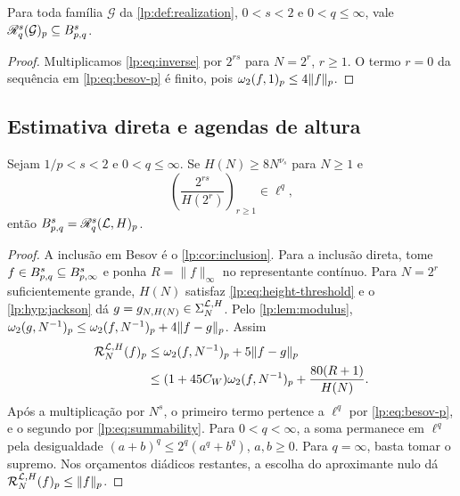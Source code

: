 \documentclass[12pt,a4paper]{article}
\begin{document}
\begin{corolario}
\label{lp:cor:inclusion}
Para toda família $\mathcal G$ da \cref{lp:def:realization}, $0<s<2$ e $0<q\le\infty$, vale
$\mathscr R^{s}_{q}(\mathcal G)_p\subseteq B^{s}_{p,q}$.
\end{corolario}

\begin{proof}
Multiplicamos \eqref{lp:eq:inverse} por $2^{rs}$ para $N=2^r$, $r\ge1$. O termo $r=0$ da sequência em \eqref{lp:eq:besov-p} é finito, pois $\omega_2(f,1)_{p}\le4\|f\|_p$.
\end{proof}

\subsection{Estimativa direta e agendas de altura}

\begin{proposicao}
\label{lp:thm:besov-conditional}
Sejam $1/p<s<2$ e $0<q\le\infty$. Se $H(N)\ge8N^{\nu_s}$ para $N\ge1$ e
\begin{equation}
 \left(\frac{2^{rs}}{H(2^r)}\right)_{r\ge1}\in\ell^q,
 \label{lp:eq:summability}
\end{equation}
então $B^{s}_{p,q}=\mathscr R^{s}_{q}(\mathcal L,H)_p$.
\end{proposicao}

\begin{proof}
A inclusão em Besov é o \cref{lp:cor:inclusion}. Para a inclusão direta, tome $f\in B^{s}_{p,q}\subseteq B^{s}_{p,\infty}$ e ponha $R=\|f\|_\infty$ no representante contínuo. Para $N=2^r$ suficientemente grande, $H(N)$ satisfaz \eqref{lp:eq:height-threshold} e o \cref{lp:hyp:jackson} dá $g=g_{N,H(N)}\in\Sigma_{N}^{\mathcal L,H}$. Pelo \cref{lp:lem:modulus},
$\omega_2(g,N^{-1})_{p}\le\omega_2(f,N^{-1})_{p}+4\|f-g\|_p$. Assim
\begin{align}
 \mathcal R^{\mathcal L,H}_{N}(f)_p
 &\le \omega_2(f,N^{-1})_{p}+5\|f-g\|_p\notag\\
 &\le (1+45 C_W)\omega_2(f,N^{-1})_{p}+\frac{80(R+1)}{H(N)}.
 \label{lp:eq:direct-bound}
\end{align}
Após a multiplicação por $N^s$, o primeiro termo pertence a $\ell^q$ por \eqref{lp:eq:besov-p}, e o segundo por \eqref{lp:eq:summability}. Para $0<q<\infty$, a soma permanece em $\ell^q$ pela desigualdade $(a+b)^q\le2^q(a^q+b^q)$, $a,b\ge0$. Para $q=\infty$, basta tomar o supremo. Nos orçamentos diádicos restantes, a escolha do aproximante nulo dá $\mathcal R^{\mathcal L,H}_{N}(f)_p\le\|f\|_p$.
\end{proof}
\end{document}
